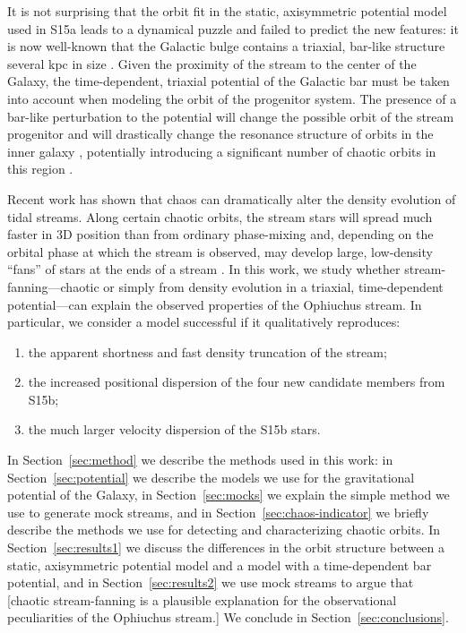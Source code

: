 \documentclass[letterpaper,12pt,preprint]{aastex}
\begin{document}
It is not surprising that the orbit fit in the static, axisymmetric potential model used in S15a leads to a dynamical puzzle and failed to predict the new features: it is now well-known that the Galactic bulge contains a triaxial, bar-like structure several kpc in size \citep[e.g.,][]{blitzXX, wegg13, MANY}. Given the proximity of the stream to the center of the Galaxy, the time-dependent, triaxial potential of the Galactic bar must be taken into account when modeling the orbit of the progenitor system. The presence of a bar-like perturbation to the potential will change the possible orbit of the stream progenitor and will drastically change the resonance structure of orbits in the inner galaxy \citep{athanassoula, portail15b, zotos12}, potentially introducing a significant number of chaotic orbits in this region \citep{weinberg15}.

Recent work has shown that chaos can dramatically alter the density evolution of tidal streams. Along certain chaotic orbits, the stream stars will spread much faster in 3D position than from ordinary phase-mixing and, depending on the orbital phase at which the stream is observed, may develop large, low-density ``fans'' of stars at the ends of a stream \citep{apw15-chaos}. In this work, we study whether stream-fanning---chaotic or simply from density evolution in a triaxial, time-dependent potential---can explain the observed properties of the Ophiuchus stream. In particular, we consider a model successful if it qualitatively reproduces:
\begin{enumerate}
	\item the apparent shortness and fast density truncation of the stream;
	\item the increased positional dispersion of the four new candidate members from S15b;
	\item the much larger velocity dispersion of the S15b stars.
\end{enumerate}

In Section~\ref{sec:method} we describe the methods used in this work: in Section~\ref{sec:potential} we describe the models we use for the gravitational potential of the Galaxy, in Section~\ref{sec:mocks} we explain the simple method we use to generate mock streams, and in Section~\ref{sec:chaos-indicator} we briefly describe the methods we use for detecting and characterizing chaotic orbits. In Section~\ref{sec:results1} we discuss the differences in the orbit structure between a static, axisymmetric potential model and a model with a time-dependent bar potential, and in Section~\ref{sec:results2} we use mock streams to argue that [chaotic stream-fanning is a plausible explanation for the observational peculiarities of the Ophiuchus stream.] We conclude in Section~\ref{sec:conclusions}.
\end{document}
